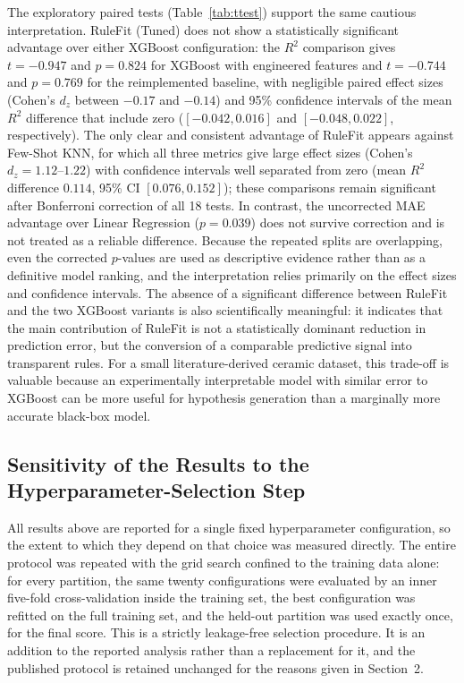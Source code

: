 \documentclass[pdflatex,sn-mathphys-num]{sn-jnl}%
\newif\ifrevmarks%
\newcommand{\revmark}[1]{\ifrevmarks\textcolor{revblue}{#1}\else#1\fi}%
\theoremstyle{thmstyleone}%
\theoremstyle{thmstyletwo}%
\theoremstyle{thmstylethree}%
\begin{document}
The exploratory paired tests (Table~\ref{tab:ttest}) support the same cautious interpretation. RuleFit (Tuned) does not show a statistically significant advantage over either XGBoost configuration: the $R^2$ comparison gives $t=-0.947$ and $p=0.824$ for XGBoost with engineered features and $t=-0.744$ and $p=0.769$ for the reimplemented baseline, with negligible paired effect sizes (Cohen's $d_z$ between $-0.17$ and $-0.14$) and 95\% confidence intervals of the mean $R^2$ difference that include zero ($[-0.042, 0.016]$ and $[-0.048, 0.022]$, respectively). The only clear and consistent advantage of RuleFit appears against Few-Shot KNN, for which all three metrics give large effect sizes (Cohen's $d_z=1.12$--$1.22$) with confidence intervals well separated from zero (mean $R^2$ difference $0.114$, 95\% CI $[0.076, 0.152]$); these comparisons remain significant after Bonferroni correction of all 18 tests. In contrast, the uncorrected MAE advantage over Linear Regression ($p=0.039$) does not survive correction and is not treated as a reliable difference. Because the repeated splits are overlapping, even the corrected $p$-values are used as descriptive evidence rather than as a definitive model ranking, and the interpretation relies primarily on the effect sizes and confidence intervals. The absence of a significant difference between RuleFit and the two XGBoost variants is also scientifically meaningful: it indicates that the main contribution of RuleFit is not a statistically dominant reduction in prediction error, but the conversion of a comparable predictive signal into transparent rules. For a small literature-derived ceramic dataset, this trade-off is valuable because an experimentally interpretable model with similar error to XGBoost can be more useful for hypothesis generation than a marginally more accurate black-box model.


\subsection{\revmark{Sensitivity of the Results to the Hyperparameter-Selection Step}}
\label{sec:selection}

\revmark{All results above are reported for a single fixed hyperparameter configuration, so the extent to which they depend on that choice was measured directly. The entire protocol was repeated with the grid search confined to the training data alone: for every partition, the same twenty configurations were evaluated by an inner five-fold cross-validation inside the training set, the best configuration was refitted on the full training set, and the held-out partition was used exactly once, for the final score. This is a strictly leakage-free selection procedure. It is an addition to the reported analysis rather than a replacement for it, and the published protocol is retained unchanged for the reasons given in Section~2.}
\end{document}
